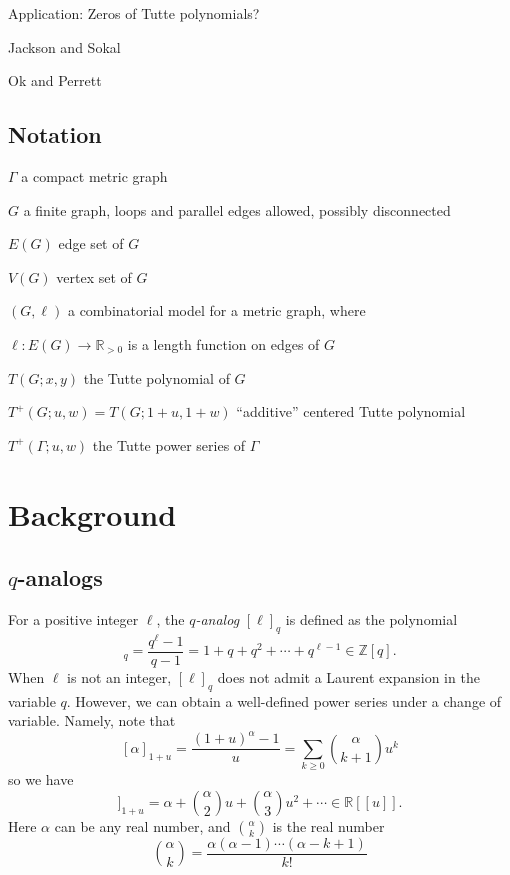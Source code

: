 \documentclass{amsart}
\theoremstyle{definition}
\newcommand{\RR}{\mathbb{R}}
\newcommand{\ZZ}{\mathbb{Z}}
\newcommand{\RRpos}{\RR_{>0}}
\newcommand{\fanalog}[2]{[\![#2]\!]_{#1}}
\begin{document}
Application: Zeros of Tutte polynomials?

Jackson and Sokal \cite{JS}

Ok and Perrett \cite{OP}


\subsection{Notation}

$\Gamma$ a compact metric graph

$G$ a finite graph, 
loops and parallel edges allowed,
possibly disconnected

$E(G)$ edge set of $G$

$V(G)$ vertex set of $G$

$(G,\ell)$ a combinatorial model for a metric graph,
where 

$\ell : E(G) \to \RRpos$
is a length function on edges of $G$

$T(G; x,y)$ the Tutte polynomial of $G$

$T^+(G; u,w) = T(G; 1+u,1+w)$ ``additive'' centered Tutte polynomial

$T^+(\Gamma; u,w)$ the Tutte power series of $\Gamma$




\section{Background}

\subsection{$q$-analogs}
For a positive integer $\ell$,
the {\em $q$-analog}
$[\ell]_q$ is defined as
the polynomial
\begin{equation*}
[\ell]_q = \frac{q^\ell - 1}{q - 1}
= 1 + q + q^2 + \cdots + q^{\ell -1} 
\in \ZZ[q].
\end{equation*}
When $\ell$ is not an integer, 
$[\ell]_q$ does not admit a Laurent expansion in the variable $q$.
However, we can obtain a well-defined power series under a change of variable.
Namely, note that
\[ [\alpha]_{1+u} = \frac{(1+u)^\alpha - 1}{u}
= \sum_{k \geq 0} \binom{\alpha}{k+1}u^{k} 
\]
so we have 
\begin{equation}
\fanalog{1+u}{\alpha} = \alpha + \binom{\alpha}{2} u + \binom{\alpha}{3} u^2 + \cdots
\in \RR[[u]] .
\end{equation}
Here $\alpha$ can be any real number, and $\binom{\alpha}{k}$ is the real number
\begin{equation}
\binom{\alpha}{k} = \frac{\alpha (\alpha-1) \cdots (\alpha-k+1)}{k!} 
\end{equation}
\end{document}
